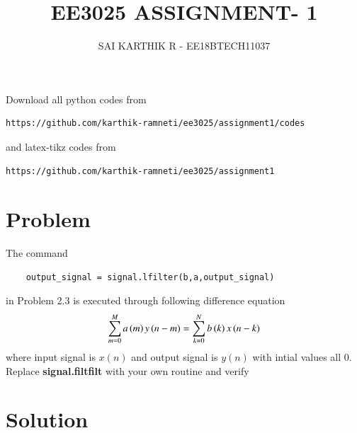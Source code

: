 \documentclass[journal,12pt,twocolumn]{IEEEtran}
\begin{document}
     \def\rightbox#1{\makebox[0in][r]{#1}}
     \def\centbox#1{\makebox[0in]{#1}}
     \def\topbox#1{\raisebox{-\baselineskip}[0in][0in]{#1}}
     \def\midbox#1{\raisebox{-0.5\baselineskip}[0in][0in]{#1}}
\vspace{3cm}
\title{EE3025 ASSIGNMENT- 1}
\author{SAI KARTHIK R - EE18BTECH11037}
\maketitle
\newpage
\bigskip
\renewcommand{\thefigure}{\theenumi}
\renewcommand{\thetable}{\theenumi}
Download all python codes from 
\begin{lstlisting}
https://github.com/karthik-ramneti/ee3025/assignment1/codes
\end{lstlisting}
%
and latex-tikz codes from 
%
\begin{lstlisting}
https://github.com/karthik-ramneti/ee3025/assignment1
\end{lstlisting}
\section{Problem}
    
The command
\begin{lstlisting}
    output_signal = signal.lfilter(b,a,output_signal)
\end{lstlisting}
in Problem 2.3 is executed through following difference equation 
    \begin{align}
        \sum _{m=0}^{M}a\left(m\right)y\left(n-m\right)=\sum _{k=0}^{N}b\left(k\right)x\left(n-k\right)
    \end{align}
 where input signal is $x(n)$ and output signal is $y(n)$ with intial values all 0. Replace \textbf{signal.filtfilt} with your own routine and verify
  \section{Solution}
  
\end{document}
